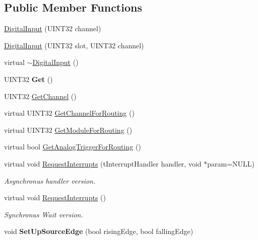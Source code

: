 \subsection*{\-Public \-Member \-Functions}
\begin{DoxyCompactItemize}
\item 
\hyperlink{classDigitalInput_a7f4562a0d04285cd07a85b2700a3522f}{\-Digital\-Input} (\-U\-I\-N\-T32 channel)
\item 
\hyperlink{classDigitalInput_ae6ac627c06728ee02f15f6fd44ddd56f}{\-Digital\-Input} (\-U\-I\-N\-T32 slot, \-U\-I\-N\-T32 channel)
\item 
virtual \hyperlink{classDigitalInput_a7fb442a9bba43bdf7303504441d1569e}{$\sim$\-Digital\-Input} ()
\item 
\hypertarget{classDigitalInput_a6852f9fdbe7aa8221d6e16675b884d44}{\-U\-I\-N\-T32 {\bfseries \-Get} ()}\label{classDigitalInput_a6852f9fdbe7aa8221d6e16675b884d44}

\item 
\-U\-I\-N\-T32 \hyperlink{classDigitalInput_a75b989a787a5b822903f24765330fcea}{\-Get\-Channel} ()
\item 
virtual \-U\-I\-N\-T32 \hyperlink{classDigitalInput_a040ad3adde43d5ca89cfde006513fdcd}{\-Get\-Channel\-For\-Routing} ()
\item 
virtual \-U\-I\-N\-T32 \hyperlink{classDigitalInput_a4401dc554ebab68503196e596c58255e}{\-Get\-Module\-For\-Routing} ()
\item 
virtual bool \hyperlink{classDigitalInput_a670ae66c6f29cfe52e58e81068e0734d}{\-Get\-Analog\-Trigger\-For\-Routing} ()
\item 
virtual void \hyperlink{classDigitalInput_ade30372b4bd2355ffdab5c38759d1901}{\-Request\-Interrupts} (t\-Interrupt\-Handler handler, void $\ast$param=\-N\-U\-L\-L)
\begin{DoxyCompactList}\small\item\em \-Asynchronus handler version. \end{DoxyCompactList}\item 
virtual void \hyperlink{classDigitalInput_add5d16083baeab64fbd62069b83e7e1a}{\-Request\-Interrupts} ()
\begin{DoxyCompactList}\small\item\em \-Synchronus \-Wait version. \end{DoxyCompactList}\item 
\hypertarget{classDigitalInput_ab53b8614e977073f11f601d484951349}{void {\bfseries \-Set\-Up\-Source\-Edge} (bool rising\-Edge, bool falling\-Edge)}\label{classDigitalInput_ab53b8614e977073f11f601d484951349}

\end{DoxyCompactItemize}


